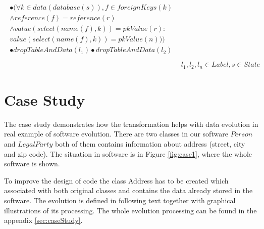 \documentclass[11pt]{article}
\begin{document}
\begin{align*}
{\begin{gathered}
\bullet (\forall k \in data(database(s)), f \in foreignKeys(k) \\ \wedge reference(f) = reference(r) \\ \wedge value(select(name(f), k)) = pkValue(r) : \\value(select(name(f), k)) = pkValue(n))) \\  \bullet dropTableAndData(l_1) \bullet dropTableAndData(l_2)
 \end{gathered}} \\\\
 & l_1, l_2, l_n \in Label, s \in State
\end{align*}

 
\section{Case Study}
The case study demonstrates how the transformation helps with data evolution in real example of software evolution. There are two classes in our software $Person$ and $LegalParty$ both of them contains information about address (street, city and zip code). The situation in software is in Figure \ref{fig:case1}, where the whole software is shown. 

To improve the design of code the class Address has to be created which associated with both original classes and contains the data already stored in the software. The evolution is defined in following text together with graphical illustrations of its processing. The whole evolution processing can be found in the appendix \ref{sec:caseStudy}.
\end{document}
